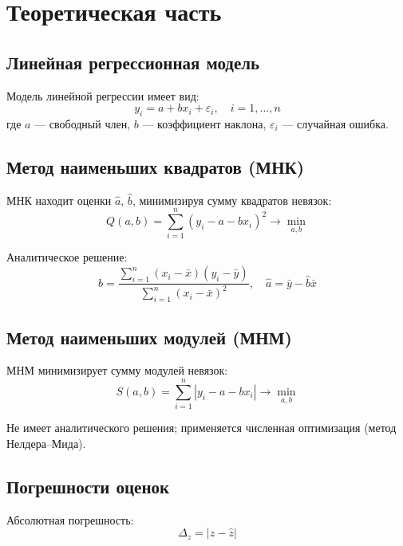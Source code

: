 \documentclass[12pt, a4paper]{article}
\begin{document}
\section{Теоретическая часть}

\subsection{Линейная регрессионная модель}

Модель линейной регрессии имеет вид:
\begin{equation}
y_i = a + b x_i + \varepsilon_i, \quad i = 1, \ldots, n
\end{equation}
где $a$ — свободный член, $b$ — коэффициент наклона, $\varepsilon_i$ — случайная ошибка.

\subsection{Метод наименьших квадратов (МНК)}

МНК находит оценки $\hat{a}$, $\hat{b}$, минимизируя сумму квадратов невязок:
\begin{equation}
Q(a, b) = \sum_{i=1}^{n} (y_i - a - b x_i)^2 \to \min_{a, b}
\end{equation}

Аналитическое решение:
\begin{equation}
\hat{b} = \frac{\sum\limits_{i=1}^{n}(x_i - \bar{x})(y_i - \bar{y})}{\sum\limits_{i=1}^{n}(x_i - \bar{x})^2}, \quad
\hat{a} = \bar{y} - \hat{b} \bar{x}
\end{equation}

\subsection{Метод наименьших модулей (МНМ)}

МНМ минимизирует сумму модулей невязок:
\begin{equation}
S(a, b) = \sum_{i=1}^{n} |y_i - a - b x_i| \to \min_{a, b}
\end{equation}

Не имеет аналитического решения; применяется численная оптимизация (метод Нелдера–Мида).

\subsection{Погрешности оценок}

Абсолютная погрешность:
\begin{equation}
\Delta_z = |z - \hat{z}|
\end{equation}
\end{document}
